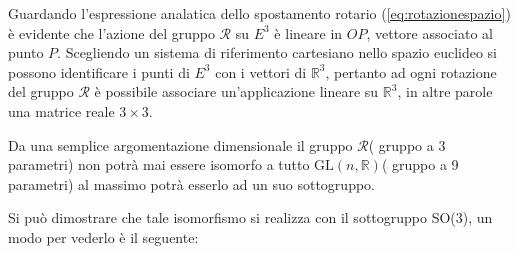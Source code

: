 \documentclass[11pt]{report}
\theoremstyle{plain}
\theoremstyle{definition}
\theoremstyle{remark}
\begin{document}
Guardando l'espressione analatica dello spostamento rotario (\ref{eq:rotazionespazio}) è evidente che l'azione del gruppo $\mathscr{R}$ su $E^{3}$ è lineare in $OP$, vettore associato al punto $P$.
Scegliendo un sistema di riferimento cartesiano nello spazio euclideo si possono identificare i punti di $E^{3}$ con i vettori di $\mathbb{R}^{3}$, pertanto ad ogni rotazione del gruppo $\mathscr{R}$ è possibile associare un'applicazione lineare su $\mathbb{R}^{3}$, in altre parole una matrice reale $3 \times 3$.

Da una semplice argomentazione dimensionale il gruppo $\mathscr{R}$( gruppo a 3 parametri) non potrà mai essere isomorfo a tutto $\textrm{GL}(n, \mathbb{R})$( gruppo a 9 parametri) al massimo potrà esserlo ad un suo sottogruppo.

Si può dimostrare che tale isomorfismo si realizza con il sottogruppo SO(3), un modo per vederlo è il seguente:
\end{document}
